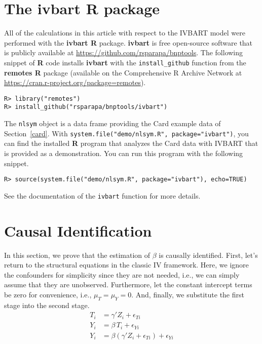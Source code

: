 
\section{The ivbart R package}\label{ivbartR}

All of the calculations in this article with respect to the IVBART
model were performed with the {\bf ivbart R} package.  {\bf ivbart}
is free open-source software that is publicly available at
\url{https://github.com/rsparapa/bnptools}.  The following
snippet of {\bf R} code installs {\bf ivbart} with the 
{\tt install\_github}
function from the {\bf remotes R} package (available on
the Comprehensive R Archive Network at 
\url{https://cran.r-project.org/package=remotes}).
\begin{verbatim}
R> library("remotes")
R> install_github("rsparapa/bnptools/ivbart")
\end{verbatim}
The {\tt nlsym} object is a data frame providing the Card example data
of Section~\ref{card}.  With {\tt system.file("demo/nlsym.R",
  package="ivbart")}, you can find the installed {\bf R} program that
analyzes the Card data with IVBART that is provided %
as a demonstration.  You can run this program with the following
snippet.
\begin{verbatim}
R> source(system.file("demo/nlsym.R", package="ivbart"), echo=TRUE)
\end{verbatim}

See the documentation of the {\tt ivbart} function for more details.

\section{Causal Identification}\label{appendix}

In this section, we prove that the estimation of $\beta$ is causally
identified.  First, let's return to the structural equations in the
classic IV framework.  Here, we ignore the confounders for simplicity
since they are not needed, i.e., we can simply assume that they are
unobserved.  Furthermore, let the constant intercept terms be zero
for convenience, i.e., $\mu_T=\mu_Y=0$.  And, finally, we substitute
the first stage into the second stage.
\begin{align}
T_i & = \gamma' Z_i  + \epsilon_{Ti} \label{tsls1} \\
Y_i & = \beta \, T_i + \epsilon_{Yi} \nonumber \\
Y_i &=  \beta (\gamma' Z_i  + \epsilon_{Ti}) + \epsilon_{Yi} \label{tsls2}
\end{align}

